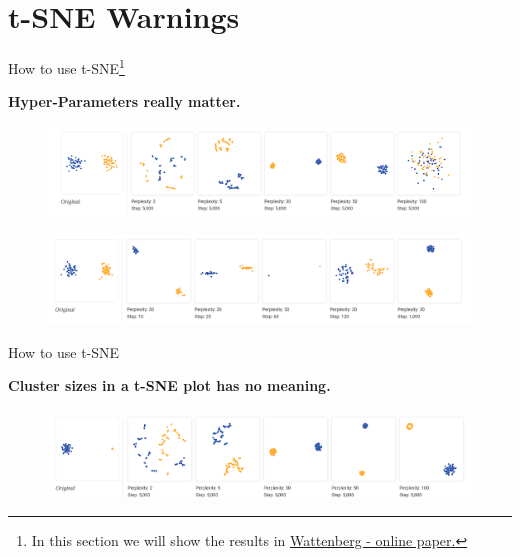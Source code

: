 \documentclass[10pt]{beamer}
\theoremstyle{definition}
\newcommand{\1}{\mathbbm{1}}
\begin{document}
\section{t-SNE Warnings}
\begin{frame}{How to use t-SNE\footnote{In this section we will show the results in
  \href{https://distill.pub/2016/misread-tsne}{\color{ggreen}Wattenberg -
online paper.}}}{}
\begin{center}
  \bf Hyper-Parameters really matter.
\end{center}
\begin{figure}[h!]
  \centering
  \includegraphics[scale=0.2, trim=3cm 0 0 0]{./pic/choose_perp.png}
\end{figure}
\begin{figure}[h!]
  \centering
  \includegraphics[scale=0.2, trim=2cm 0 0 3cm]{./pic/choose_steps.png}
\end{figure}
\hspace{3cm}
\end{frame}
\begin{frame}{How to use t-SNE}
  \begin{center}
    \bf
    Cluster sizes in a t-SNE plot has no meaning.
  \end{center}
  \begin{figure}[h]
    \centering
    \includegraphics[scale=0.2, trim=2cm 0 0 0]{./pic/cluster_size.png}
  \end{figure}
\end{frame}
\end{document}
